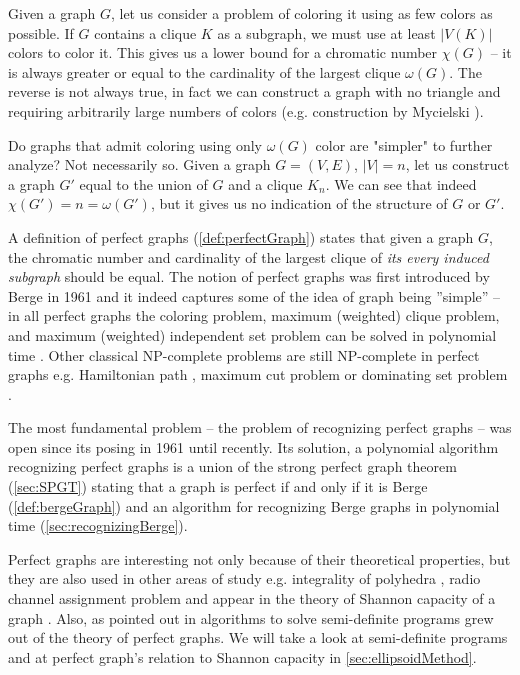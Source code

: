 Given a graph $G$, let us consider a problem of coloring it using as few colors as possible. If $G$ contains a clique $K$ as a subgraph, we must use at least $|V(K)|$ colors to color it. This gives us a lower bound for a chromatic number $\chi(G)$ -- it is always greater or equal to the cardinality of the largest clique $\omega(G)$. The reverse is not always true, in fact we can construct a graph with no triangle and requiring arbitrarily large numbers of colors (e.g. construction by Mycielski \cite{Mycielski1955}).

Do graphs that admit coloring using only $\omega(G)$ color are "simpler" to further analyze? Not necessarily so. Given a graph $G = (V, E)$, $|V| = n$, let us construct a graph $G'$ equal to the union of $G$ and a clique $K_n$. We can see that indeed $\chi(G') = n = \omega(G')$, but it gives us no indication of the structure of $G$ or $G'$.

A definition of perfect graphs (\cref{def:perfectGraph}) states that given a graph $G$, the chromatic number and cardinality of the largest clique of \emph{its every induced subgraph} should be equal. The notion of perfect graphs was first introduced by Berge in 1961 \cite{CB61} and it indeed captures some of the idea of graph being ''simple'' -- in all perfect graphs the coloring problem, maximum (weighted) clique problem, and maximum (weighted) independent set problem can be solved in polynomial time \cite{grotschel1993}. Other classical NP-complete problems are still NP-complete in perfect graphs e.g. Hamiltonian path \cite{Mller1996}, maximum cut problem \cite{Bodlaender1994} or dominating set problem \cite{Dewdney81}. 

The most fundamental problem -- the problem of recognizing perfect graphs -- was open since its posing in 1961 until recently. Its solution, a polynomial algorithm recognizing perfect graphs is a union of the strong perfect graph theorem (\cref{sec:SPGT}) stating that a graph is perfect if and only if it is Berge (\cref{def:bergeGraph}) and an algorithm for recognizing Berge graphs in polynomial time (\cref{sec:recognizingBerge}).

Perfect graphs are interesting not only because of their theoretical properties, but they are also used in other areas of study e.g. integrality of polyhedra \cite{Chvtal1975, Chudnovsky2003}, radio channel assignment problem \cite{McDiarmid99, McDiarmid2000} and appear in the theory of Shannon capacity of a graph \cite{Lovasz1979}. Also, as pointed out in \cite{alfonsinPerfect2001, Chudnovsky2003} algorithms to solve semi-definite programs grew out of the theory of perfect graphs. We will take a look at semi-definite programs and at perfect graph's relation to Shannon capacity in \cref{sec:ellipsoidMethod}.


